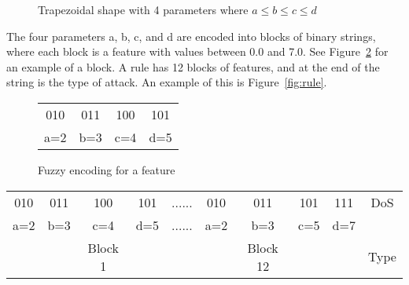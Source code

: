 \documentclass{sig-alternate}
\begin{document}
\begin{figure}
\centering
{}
\caption{Trapezoidal shape with 4 parameters where $a\leq b\leq c\leq d$}
\label{fig:trapFigure}
\end{figure}

\begin{algorithm}
\caption{Fuzzy Algorithm}
\label{alg:fuzAlg}
\begin{algorithmic}
\ELSE {}
\ENDIF
\end{algorithmic}
\end{algorithm}

The four parameters a, b, c, and d are encoded into blocks of binary strings, where each block is a feature with values between 0.0 and 7.0. See Figure~\ref{fig:fuzEncodingForFeature} for an example of a block. A rule has 12 blocks of features, and at the end of the string is the type of attack. An example of this is Figure~\ref{fig:rule}.

\begin{figure}
\centering
\caption{Fuzzy encoding for a feature}
\begin{tabular}{|cccc|} \hline
010 & 011 & 100 & 101\\
a=2 & b=3 & c=4 & d=5\\
\hline\end{tabular}
\label{fig:fuzEncodingForFeature}
\end{figure}

\begin{figure*}
\centering
\caption{A rule with 12 blocks of features}
\begin{tabular}{|cccc|c|cccc|c|} \hline
010 & 011 & 100 & 101   & ...... & 010 & 011 & 101 & 111   & DoS\\
a=2 & b=3 & c=4 & d=5   & ...... & a=2 & b=3 & c=5 & d=7   &\\ 
    &     & Block 1&    &        &     & Block 12& &       & Type\\
\hline\end{tabular}
\label{fig:rule}
\end{figure*}
\end{document}

